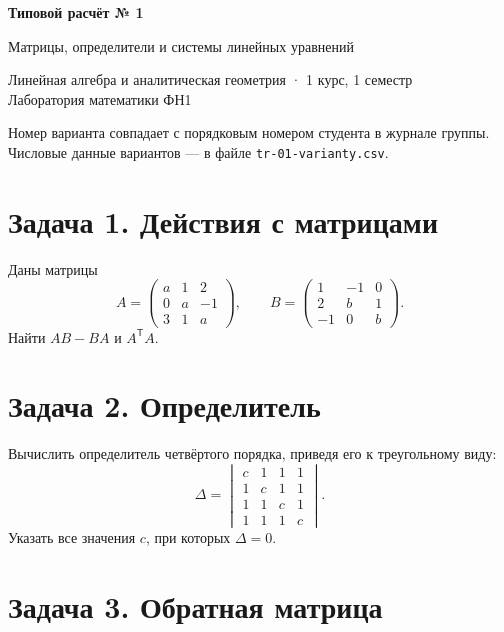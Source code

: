 \documentclass[12pt, a4paper]{article}
\begin{document}
\begin{center}
  {\large\bfseries Типовой расчёт № 1}

  \vspace{0.3em}
  {\large Матрицы, определители и системы линейных уравнений}

  \vspace{0.5em}
  {\small Линейная алгебра и аналитическая геометрия · 1 курс, 1 семестр\\
  Лаборатория математики ФН1}
\end{center}

\vspace{1em}

\noindent
Номер варианта совпадает с порядковым номером студента в журнале группы.
Числовые данные вариантов — в файле \texttt{tr-01-varianty.csv}.

\section*{Задача 1. Действия с матрицами}

Даны матрицы
\[
A = \begin{pmatrix} a & 1 & 2 \\ 0 & a & -1 \\ 3 & 1 & a \end{pmatrix},
\qquad
B = \begin{pmatrix} 1 & -1 & 0 \\ 2 & b & 1 \\ -1 & 0 & b \end{pmatrix}.
\]
Найти $AB - BA$ и $A^{\mathsf T}A$.

\section*{Задача 2. Определитель}

Вычислить определитель четвёртого порядка, приведя его к треугольному виду:
\[
\Delta =
\begin{vmatrix}
c & 1 & 1 & 1 \\
1 & c & 1 & 1 \\
1 & 1 & c & 1 \\
1 & 1 & 1 & c
\end{vmatrix}.
\]
Указать все значения $c$, при которых $\Delta = 0$.

\section*{Задача 3. Обратная матрица}
\end{document}
